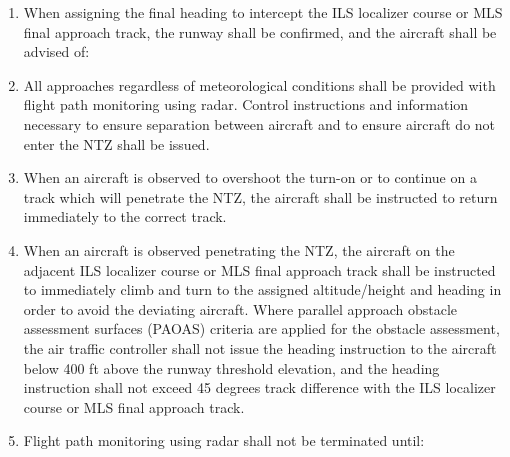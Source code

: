 \begin{enumeratesc}
\begin{enumerate}
        \item When assigning the final heading to intercept the ILS localizer course or MLS final approach track, the runway shall be confirmed, and the aircraft shall be advised of:


        \item All approaches regardless of meteorological conditions shall be provided with flight path monitoring using radar. Control instructions and information necessary to ensure separation between aircraft and to ensure aircraft do not enter the NTZ shall be issued.
        \item When an aircraft is observed to overshoot the turn-on or to continue on a track which will penetrate the NTZ, the aircraft shall be instructed to return immediately to the correct track.
        \item When an aircraft is observed penetrating the NTZ, the aircraft on the adjacent ILS localizer course or MLS final approach track shall be instructed to immediately climb and turn to the assigned altitude/height and heading in order to avoid the deviating aircraft. Where parallel approach obstacle assessment surfaces (PAOAS) criteria are applied for the obstacle assessment, the air traffic controller shall not issue the heading instruction to the aircraft below 400 ft above the runway threshold elevation, and the heading instruction shall not exceed 45 degrees track difference with the ILS localizer course or MLS final approach track.
        \item Flight path monitoring using radar shall not be terminated until:


\end{enumerate}
\end{enumeratesc}
